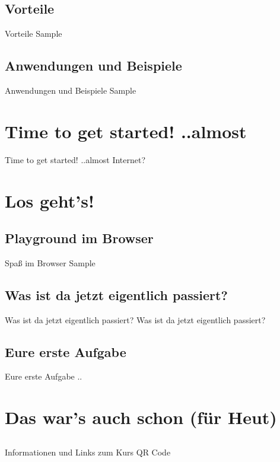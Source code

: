 \subsection{Vorteile}
\begin{frame}{Vorteile}
	Sample
\end{frame}


\subsection{Anwendungen und Beispiele}
\begin{frame}{Anwendungen und Beispiele}
	Sample
\end{frame}



\section{Time to get started! ..almost}

\begin{frame}{Time to get started! ..almost}
	Internet?
\end{frame}




\section{Los geht's!}


\subsection{Playground im Browser}
\begin{frame}{Spaß im Browser}
	Sample
\end{frame}


\subsection{Was ist da jetzt eigentlich passiert?}
\begin{frame}{Was ist da jetzt eigentlich passiert?}
	Was ist da jetzt eigentlich passiert?
\end{frame}


\subsection{Eure erste Aufgabe}
\begin{frame}{Eure erste Aufgabe}
	..
\end{frame}



\section{Das war's auch schon (für Heut)}


\subsection{}
\begin{frame}{Informationen und Links zum Kurs}
	QR Code
\end{frame}


